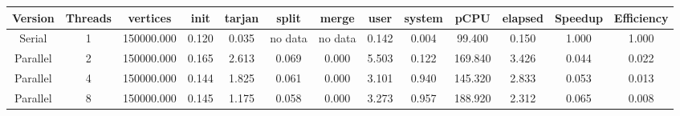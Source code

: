 \begin{tabular}{|c|c|c|c|c|c|c|c|c|c|c|c|c|}
\toprule
 Version &  Threads &   vertices &  init &  tarjan &   split &   merge &  user &  system &    pCPU &  elapsed &  Speedup &  Efficiency \\
\midrule
  Serial &        1 & 150000.000 & 0.120 &   0.035 & no data & no data & 0.142 &   0.004 &  99.400 &    0.150 &    1.000 &       1.000 \\
Parallel &        2 & 150000.000 & 0.165 &   2.613 &   0.069 &   0.000 & 5.503 &   0.122 & 169.840 &    3.426 &    0.044 &       0.022 \\
Parallel &        4 & 150000.000 & 0.144 &   1.825 &   0.061 &   0.000 & 3.101 &   0.940 & 145.320 &    2.833 &    0.053 &       0.013 \\
Parallel &        8 & 150000.000 & 0.145 &   1.175 &   0.058 &   0.000 & 3.273 &   0.957 & 188.920 &    2.312 &    0.065 &       0.008 \\
\bottomrule
\end{tabular}
